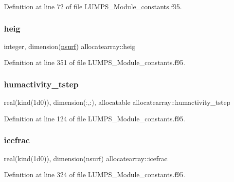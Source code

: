 Definition at line 72 of file L\+U\+M\+P\+S\+\_\+\+Module\+\_\+constants.\+f95.

\mbox{\label{namespaceallocatearray_a0d080c680eb400a8742276b57c625224}} 
\subsubsection{\texorpdfstring{heig}{heig}}
{\footnotesize\ttfamily integer, dimension(\hyperlink{namespaceallocatearray_acd22f92a06f7e9a2a91426b3dc99fdb0}{nsurf}) allocatearray\+::heig}



Definition at line 351 of file L\+U\+M\+P\+S\+\_\+\+Module\+\_\+constants.\+f95.

\mbox{\label{namespaceallocatearray_ae27c6668e2bfb798c38cf0e347949fde}} 
\subsubsection{\texorpdfstring{humactivity\+\_\+tstep}{humactivity\_tstep}}
{\footnotesize\ttfamily real(kind(1d0)), dimension(\+:,\+:), allocatable allocatearray\+::humactivity\+\_\+tstep}



Definition at line 124 of file L\+U\+M\+P\+S\+\_\+\+Module\+\_\+constants.\+f95.

\mbox{\label{namespaceallocatearray_af9cf09d85fc9f2037dbfffabb0a6dd8c}} 
\subsubsection{\texorpdfstring{icefrac}{icefrac}}
{\footnotesize\ttfamily real(kind(1d0)), dimension(nsurf) allocatearray\+::icefrac}



Definition at line 324 of file L\+U\+M\+P\+S\+\_\+\+Module\+\_\+constants.\+f95.

\mbox{\label{namespaceallocatearray_ad5f029a4d718b470c2e33f000bde77f5}} 
